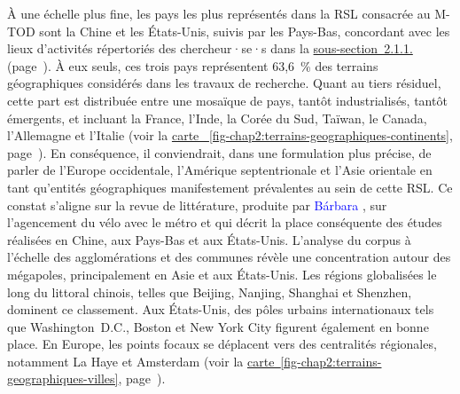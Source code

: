 \begin{refsegment}
À une échelle plus fine, les pays les plus représentés dans la \acrshort{RSL} consacrée au \acrshort{M-TOD} sont la Chine et les États-Unis, suivis par les Pays-Bas, concordant avec les lieux d'activités répertoriés des chercheur·se·s dans la \hyperref[chap2:analyse-bibliometrique]{sous-section~2.1.1.} (page~\pageref{chap2:analyse-bibliometrique}). À eux seuls, ces trois pays représentent 63,6~\% des terrains géographiques considérés dans les travaux de recherche. Quant au tiers résiduel, cette part est distribuée entre une mosaïque de pays, tantôt industrialisés, tantôt émergents, et incluant la France, l'Inde, la Corée du Sud, Taïwan, le Canada, l'Allemagne et l'Italie (voir la \hyperref[fig-chap2:terrains-geographiques-continents]{carte ~\ref{fig-chap2:terrains-geographiques-continents}}, page~\pageref{fig-chap2:terrains-geographiques-continents}). En conséquence, il conviendrait, dans une formulation plus précise, de parler de l'Europe occidentale, l'Amérique septentrionale et l'Asie orientale en tant qu'entités géographiques manifestement prévalentes au sein de cette \acrshort{RSL}. Ce constat s'aligne sur la revue de littérature, produite par \textcolor{blue}{Bárbara} \textcolor{blue}{\textcite[17]{jansson_almeida_alternativas_2022}}, sur l'agencement du vélo avec le métro et qui décrit la place conséquente des études réalisées en Chine, aux Pays-Bas et aux États-Unis. L'analyse du corpus à l'échelle des agglomérations et des communes révèle une concentration autour des mégapoles, principalement en Asie et aux États-Unis. Les régions globalisées le long du littoral chinois, telles que Beijing, Nanjing, Shanghai et Shenzhen, dominent ce classement. Aux États-Unis, des pôles urbains internationaux tels que Washington~D.C., Boston et New York City figurent également en bonne place. En Europe, les points focaux se déplacent vers des centralités régionales, notamment La Haye et Amsterdam (voir la \hyperref[fig-chap2:terrains-geographiques-villes]{carte~\ref{fig-chap2:terrains-geographiques-villes}}, page~\pageref{fig-chap2:terrains-geographiques-villes}). %


\end{refsegment}
